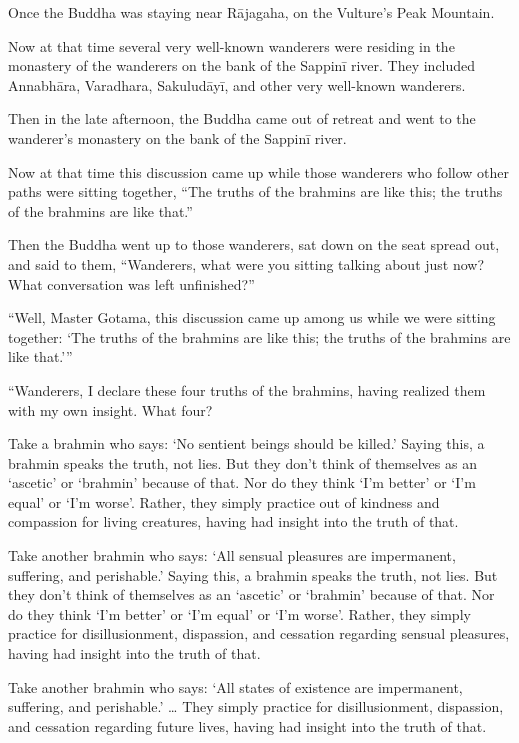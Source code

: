 \documentclass[12pt,openany]{book}%
\begin{document}
Once the Buddha was staying near \textsanskrit{Rājagaha}, on the Vulture’s Peak Mountain. 

Now at that time several very well-known wanderers were residing in the monastery of the wanderers on the bank of the \textsanskrit{Sappinī} river. They included \textsanskrit{Annabhāra}, Varadhara, \textsanskrit{Sakuludāyī}, and other very well-known wanderers. 

Then in the late afternoon, the Buddha came out of retreat and went to the wanderer’s monastery on the bank of the \textsanskrit{Sappinī} river. 

Now at that time this discussion came up while those wanderers who follow other paths were sitting together, “The truths of the brahmins are like this; the truths of the brahmins are like that.” 

Then the Buddha went up to those wanderers, sat down on the seat spread out, and said to them, “Wanderers, what were you sitting talking about just now? What conversation was left unfinished?” 

“Well, Master Gotama, this discussion came up among us while we were sitting together: ‘The truths of the brahmins are like this; the truths of the brahmins are like that.’” 

“Wanderers, I declare these four truths of the brahmins, having realized them with my own insight. What four? 

Take a brahmin who says: ‘No sentient beings should be killed.’ Saying this, a brahmin speaks the truth, not lies. But they don’t think of themselves as an ‘ascetic’ or ‘brahmin’ because of that. Nor do they think ‘I’m better’ or ‘I’m equal’ or ‘I’m worse’. Rather, they simply practice out of kindness and compassion for living creatures, having had insight into the truth of that. 

Take another brahmin who says: ‘All sensual pleasures are impermanent, suffering, and perishable.’ Saying this, a brahmin speaks the truth, not lies. But they don’t think of themselves as an ‘ascetic’ or ‘brahmin’ because of that. Nor do they think ‘I’m better’ or ‘I’m equal’ or ‘I’m worse’. Rather, they simply practice for disillusionment, dispassion, and cessation regarding sensual pleasures, having had insight into the truth of that. 

Take another brahmin who says: ‘All states of existence are impermanent, suffering, and perishable.’ … They simply practice for disillusionment, dispassion, and cessation regarding future lives, having had insight into the truth of that. 
\end{document}
